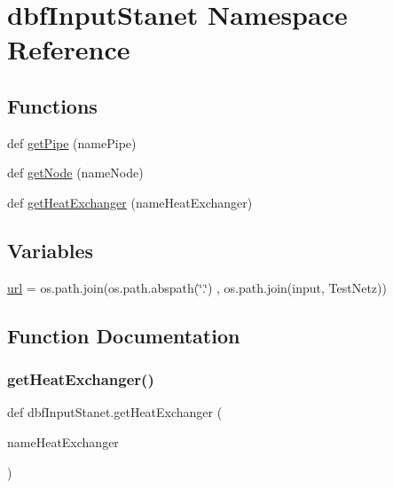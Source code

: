\hypertarget{namespacedbf_input_stanet}{}\section{dbf\+Input\+Stanet Namespace Reference}
\label{namespacedbf_input_stanet}
\subsection*{Functions}
\begin{DoxyCompactItemize}
\item 
def \hyperlink{namespacedbf_input_stanet_a33ccd8626c4dfbd223fa22ae27efdd8d}{get\+Pipe} (name\+Pipe)
\item 
def \hyperlink{namespacedbf_input_stanet_a1df8b485c2384b611f5ec1c3eb97653b}{get\+Node} (name\+Node)
\item 
def \hyperlink{namespacedbf_input_stanet_ab3508db83b066e71bc0a35e7fb3684ef}{get\+Heat\+Exchanger} (name\+Heat\+Exchanger)
\end{DoxyCompactItemize}
\subsection*{Variables}
\begin{DoxyCompactItemize}
\item 
\hyperlink{namespacedbf_input_stanet_af54a8f3f60e0d2930e153f8cdcc7d5d6}{url} = os.\+path.\+join(os.\+path.\+abspath(\char`\"{}.\char`\"{}) , os.\+path.\+join(\textquotesingle{}input\textquotesingle{}, \textquotesingle{}Test\+Netz\textquotesingle{}))
\end{DoxyCompactItemize}


\subsection{Function Documentation}
\mbox{\label{namespacedbf_input_stanet_ab3508db83b066e71bc0a35e7fb3684ef}} 
\subsubsection{\texorpdfstring{get\+Heat\+Exchanger()}{getHeatExchanger()}}
{\footnotesize\ttfamily def dbf\+Input\+Stanet.\+get\+Heat\+Exchanger (\begin{DoxyParamCaption}\item[{}]{name\+Heat\+Exchanger }\end{DoxyParamCaption})}



